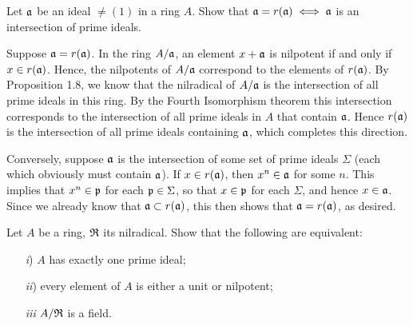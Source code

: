 \documentclass[10pt]{amsart}
\begin{document}
\begin{exercise}
    Let $\mathfrak{a}$ be an ideal $\ne (1)$ in a ring $A$. Show that 
    $\mathfrak{a} = r(\mathfrak{a}) \iff \mathfrak{a}$ is an intersection of prime ideals.
\end{exercise}

\begin{solution}
    Suppose $\mathfrak{a} = r(\mathfrak{a})$. In the ring $A/\mathfrak{a}$, an element 
    $x  +\mathfrak{a}$ is nilpotent if and only if $x \in r(\mathfrak{a})$. 
    Hence, the nilpotents of $A/\mathfrak{a}$ correspond to the elements of $r(\mathfrak{a})$. 
    By Proposition 1.8, we know that the nilradical of $A/\mathfrak{a}$ is the intersection 
    of all prime ideals in this ring. By the Fourth Isomorphism theorem 
    this intersection corresponds to the intersection of all prime ideals in $A$ that 
    contain $\mathfrak{a}$. Hence $r(\mathfrak{a})$ is the intersection of all prime ideals 
    containing $\mathfrak{a}$, which completes this direction. 

    Conversely, suppose $\mathfrak{a}$ is the intersection of some set of 
    prime ideals $\Sigma$ (each which obviously must contain $\mathfrak{a}$).
    If $x \in r(\mathfrak{a})$, then $x^n \in \mathfrak{a}$ for some $n$. This implies that 
    $x^n \in \mathfrak{p}$ for each $\mathfrak{p} \in \Sigma$, so that $x \in \mathfrak{p}$ for each $\Sigma$, and 
    hence $x \in \mathfrak{a}$. Since we already know that $\mathfrak{a} \subset r(\mathfrak{a})$, this then 
    shows that $\mathfrak{a} = r(\mathfrak{a})$, as desired. 
\end{solution}

\begin{exercise}
    Let $A$ be a ring, $\mathfrak{R}$ its nilradical. Show that the following are equivalent: 
    \begin{itemize}
        \item[\emph{i})] $A$ has exactly one prime ideal;
        \item[\emph{ii})] every element of $A$ is either a unit or nilpotent; 
        \item[\emph{iii}] $A/\mathfrak{R}$ is a field.    
    \end{itemize}
\end{exercise}
\end{document}
